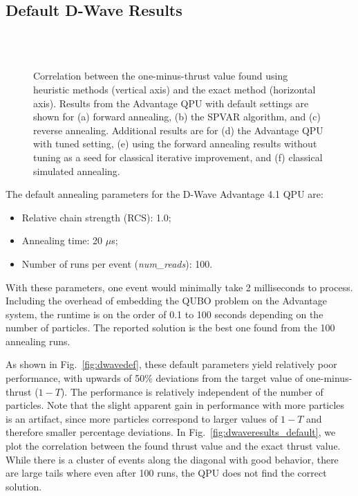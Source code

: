 \documentclass[aps,prd,twocolumn,superscriptaddress,preprintnumbers,nofootinbib,longbibliography,floatfix]{revtex4-1}
\newcommand{\jdt}[1]{\textbf{\textcolor{red}{(#1 --jdt)}}}
\DeclareRobustCommand{\Fig}[1]{Fig.~\ref{fig:#1}}
\begin{document}
\subsection{Default D-Wave Results}
\label{sec:default_results}


\begin{figure*}[p]
\centering
{}
%
\\
%
%
\\
%
%
\caption{
%
Correlation between the one-minus-thrust value found using heuristic methods (vertical axis) and the exact method (horizontal axis).
%
Results from the Advantage QPU with default settings are shown for (a) forward annealing, (b) the SPVAR algorithm, and (c) reverse annealing.
%
Additional results are for (d) the Advantage QPU with tuned setting, (e) using the forward annealing results without tuning as a seed for classical iterative improvement, and (f) classical simulated annealing.
}
\end{figure*}

The default annealing parameters for the D-Wave Advantage 4.1 QPU are:
%
\begin{itemize}
    \item Relative chain strength (RCS):  1.0; 
    \item Annealing time: 20 $\mu$s;
    \item Number of runs per event (\textit{num\_reads}):  100.
\end{itemize}
%
With these parameters, one event would minimally take 2 milliseconds to process.
%
Including the overhead of embedding the QUBO problem on the Advantage system, the runtime is on the order of 0.1 to 100 seconds depending on the number of particles.
%
The reported solution is the best one found from the 100 annealing runs.  


As shown in \Fig{dwavedef}, these default parameters yield relatively poor performance, with upwards of 50\% deviations from the target value of one-minus-thrust ($1-T$).
%
The performance is relatively independent of the number of particles.
%
Note that the slight apparent gain in performance with more particles is an artifact, since more particles correspond to larger values of $1-T$ and therefore smaller percentage deviations.
%
In \Fig{dwaveresults_default}, we plot the correlation between the found thrust value and the exact thrust value.
%
While there is a cluster of events along the diagonal with good behavior, there are large tails where even after 100 runs, the QPU does not find the correct solution.
\end{document}

